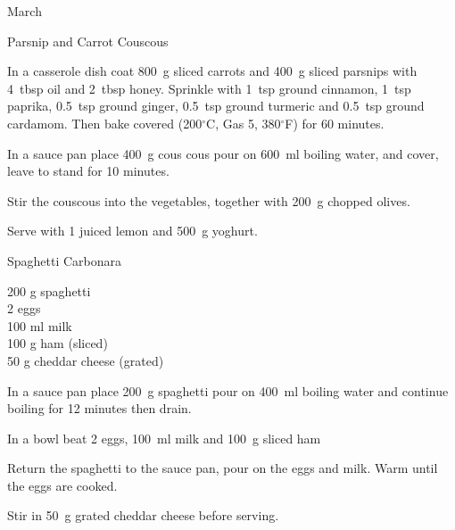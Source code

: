 \begin{menu}{March}
\begin{recipe}{2}{Parsnip and Carrot Couscous}
    \begin{instructions}
    \item 
        In a casserole dish coat
        800~g sliced carrots
        and
        400~g sliced parsnips
        with
        4~tbsp  oil
        and
        2~tbsp  honey.
        Sprinkle with
        1~tsp  ground cinnamon,
        1~tsp  paprika,
        0.5~tsp  ground ginger,
        0.5~tsp  ground turmeric
        and
        0.5~tsp  ground cardamom.
        Then bake covered
        (200$^{\circ}$C, Gas 5, 380$^{\circ}$F)
        for 60 minutes.
      \item 
    In a
    sauce pan 
    place
    400~g  cous cous
    pour on
    600~ml  boiling water,
    and cover, leave to stand for 10 minutes.
  \item 
        Stir the couscous into the vegetables,
        together with
        200~g chopped olives.
      \item 
        Serve with 1 juiced lemon
        and
        500~g  yoghurt.
      
    \end{instructions}
    \end{recipe}%
  
    \begin{recipe}{1}{Spaghetti Carbonara}%
		\begin{ingredients}
		200 g spaghetti  \\
	2  eggs  \\
	100 ml milk  \\
	100 g ham (sliced) \\
	50 g cheddar cheese (grated) \\
	
		\end{ingredients}
	
	
	
    \begin{instructions}
    \item 
    In a
    sauce pan
    place
    200~g  spaghetti
    pour on
    400~ml  boiling water and continue boiling for 12 minutes then drain.
  \item 
        In a bowl beat
        2  eggs,
        100~ml  milk
        and
        100~g sliced ham\item 
        Return the spaghetti to the sauce pan,
        pour on the eggs and milk.
        Warm until the eggs are cooked.
      \item 
        Stir in
        50~g grated cheddar cheese
        before serving.
      
    \end{instructions}
    \end{recipe}%
  
    \clearpage
    \end{menu}
	
